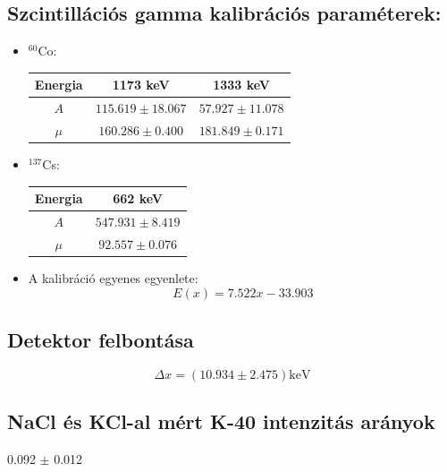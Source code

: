 \documentclass[12pt,a4paper]{article}
\begin{document}
\subsection{Szcintillációs gamma kalibrációs paraméterek:}
\begin{itemize}
\item $^{60}$Co:
\begin{center}
\begin{tabular}{|c|c||c|}
\hline
Energia & 1173 keV & 1333 keV \\ 
\hline
$A$ & $115.619 \pm 18.067$ & $57.927 \pm 11.078$\\
\hline
$\mu$ & $160.286 \pm 0.400$ & $181.849 \pm 0.171$\\
\hline
\end{tabular}
\end{center}
\item $^{137}$Cs:
\begin{center}

\begin{tabular}{|c|c|}
\hline
Energia & 662 keV \\ 
\hline
$A$ & $547.931 \pm 8.419$\\
\hline
$\mu$ & $92.557 \pm 0.076$\\
\hline
\end{tabular}
\end{center}
\item A kalibráció egyenes egyenlete:
\begin{equation*}
E(x)=7.522x-33.903
\end{equation*}
\end{itemize}
\subsection{Detektor felbontása}
\begin{equation*}
\Delta x=(10.934 \pm 2.475)\mathrm{keV}
\end{equation*}
\subsection{NaCl és KCl-al mért K-40 intenzitás arányok}
\begin{center}
0.092 $\pm$ 0.012
\end{center}
\end{document}
